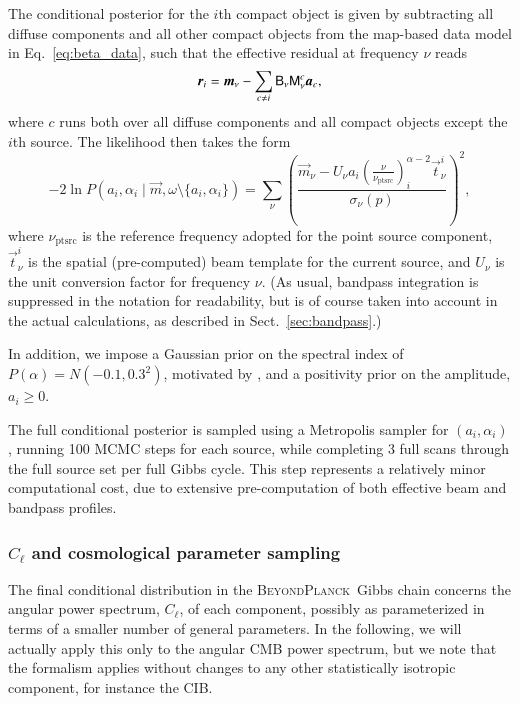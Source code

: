 \documentclass[twocolumn]{aa}
\renewcommand{\t}[0]{\vec{t}}
\renewcommand{\a}[0]{\vec{a}}
\newcommand{\m}[0]{\vec{m}}
\newcommand{\B}[0]{\tens{B}}
\newcommand{\M}[0]{\tens{M}}
\renewcommand{\r}[0]{\vec{r}}
\newcommand{\BP}{\textsc{BeyondPlanck}}
\begin{document}
The conditional posterior for the $i$th compact object is given by
subtracting all diffuse components and all other compact objects from
the map-based data model in Eq.~\eqref{eq:beta_data}, such that the
effective residual at frequency $\nu$ reads
\begin{equation}
  \r_{i} = \m_{\nu} - \sum_{c\ne i} \B_{\nu}\M^c_{\nu}\a_c,
\end{equation}
where $c$ runs both over all diffuse components and all compact
objects except the $i$th source. The likelihood then takes the form
\begin{equation}
  -2\ln P(a_i, \alpha_i\mid \m, \omega\setminus \{a_i, \alpha_i\}) =
  \sum_{\nu}\left(\frac{\m_{\nu} - U_\nu
    a_i\left(\frac{\nu}{\nu_{\mathrm{ptsrc}}}\right)^{\alpha-2}_i \t_{\nu}^i}{\sigma_{\nu}(p)}\right)^2,
\label{eq:lnL_likelihood}
\end{equation}
where $\nu_{\mathrm{ptsrc}}$ is the reference frequency adopted for
the point source component, $\t_\nu^i$ is the spatial (pre-computed)
beam template for the current source, and $U_\nu$ is the unit
conversion factor for frequency $\nu$. (As usual, bandpass integration
is suppressed in the notation for readability, but is of course taken
into account in the actual calculations, as described in
Sect.~\ref{sec:bandpass}.) 

In addition, we impose a Gaussian prior on the spectral index of
$P(\alpha) = N(-0.1,0.3^2)$, motivated by \citet{bennett2012}, and a
positivity prior on the amplitude, $a_i \ge 0$.

The full conditional posterior is sampled using a Metropolis sampler
for $(a_i, \alpha_i)$, running 100 MCMC steps for each source, while
completing 3 full scans through the full source set per full Gibbs
cycle. This step represents a relatively minor computational cost, due
to extensive pre-computation of both effective beam and bandpass
profiles.

\subsubsection{$C_{\ell}$ and cosmological parameter sampling}
\label{sec:powspec}  

The final conditional distribution in the \BP\ Gibbs chain concerns
the angular power spectrum, $C_{\ell}$, of each component, possibly as
parameterized in terms of a smaller number of general parameters. In
the following, we will actually apply this only to the angular CMB
power spectrum, but we note that the formalism applies without changes to
any other statistically isotropic component, for instance the CIB.
\end{document}
